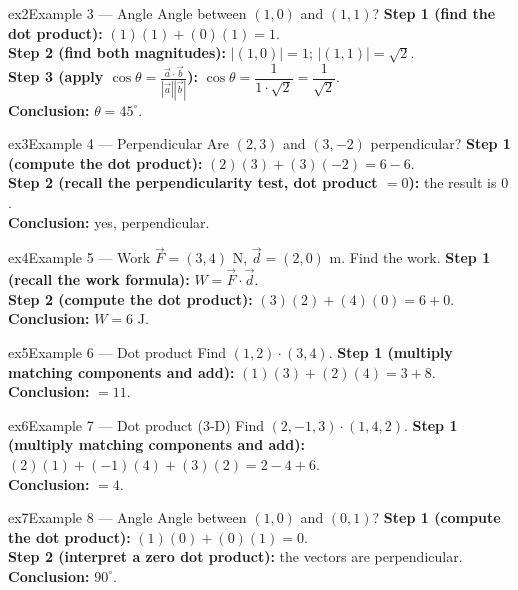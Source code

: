 \documentclass[11pt]{article}
\begin{document}
\begin{example}{ex2}{Example 3 --- Angle}
Angle between $(1,0)$ and $(1,1)$?\soln
\textbf{Step 1 (find the dot product):} $(1)(1)+(0)(1)=1$.\\[3pt]
\textbf{Step 2 (find both magnitudes):} $|(1,0)|=1$; $|(1,1)|=\sqrt2$.\\[3pt]
\textbf{Step 3 (apply $\cos\theta=\frac{\vec a\cdot\vec b}{|\vec a||\vec b|}$):} $\cos\theta=\dfrac{1}{1\cdot\sqrt2}=\dfrac1{\sqrt2}$.\\[3pt]
\textbf{Conclusion:} $\theta=45^\circ$.
\end{example}

\begin{example}{ex3}{Example 4 --- Perpendicular}
Are $(2,3)$ and $(3,-2)$ perpendicular?\soln
\textbf{Step 1 (compute the dot product):} $(2)(3)+(3)(-2)=6-6$.\\[3pt]
\textbf{Step 2 (recall the perpendicularity test, dot product $=0$):} the result is $0$.\\[3pt]
\textbf{Conclusion:} yes, perpendicular.
\end{example}

\begin{example}{ex4}{Example 5 --- Work}
$\vec F=(3,4)$ N, $\vec d=(2,0)$ m. Find the work.\soln
\textbf{Step 1 (recall the work formula):} $W=\vec F\cdot\vec d$.\\[3pt]
\textbf{Step 2 (compute the dot product):} $(3)(2)+(4)(0)=6+0$.\\[3pt]
\textbf{Conclusion:} $W=6$ J.
\end{example}

\begin{example}{ex5}{Example 6 --- Dot product}
Find $(1,2)\cdot(3,4)$.\soln
\textbf{Step 1 (multiply matching components and add):} $(1)(3)+(2)(4)=3+8$.\\[3pt]
\textbf{Conclusion:} $=11$.
\end{example}

\begin{example}{ex6}{Example 7 --- Dot product (3-D)}
Find $(2,-1,3)\cdot(1,4,2)$.\soln
\textbf{Step 1 (multiply matching components and add):} $(2)(1)+(-1)(4)+(3)(2)=2-4+6$.\\[3pt]
\textbf{Conclusion:} $=4$.
\end{example}

\begin{example}{ex7}{Example 8 --- Angle}
Angle between $(1,0)$ and $(0,1)$?\soln
\textbf{Step 1 (compute the dot product):} $(1)(0)+(0)(1)=0$.\\[3pt]
\textbf{Step 2 (interpret a zero dot product):} the vectors are perpendicular.\\[3pt]
\textbf{Conclusion:} $90^\circ$.
\end{example}
\end{document}
